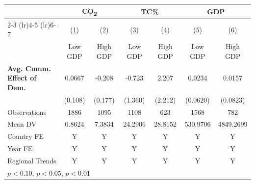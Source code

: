 \begin{tabular}{l*{6}{c}}
\hline
& \multicolumn{2}{c}{CO\textsubscript{2}} & \multicolumn{2}{c}{TC\%} & \multicolumn{2}{c}{GDP} \\
\cmidrule(lr){2-3} \cmidrule(lr){4-5} \cmidrule(lr){6-7}
            &\multicolumn{1}{c}{(1)}&\multicolumn{1}{c}{(2)}&\multicolumn{1}{c}{(3)}&\multicolumn{1}{c}{(4)}&\multicolumn{1}{c}{(5)}&\multicolumn{1}{c}{(6)}\\
            &\multicolumn{1}{c}{Low GDP}&\multicolumn{1}{c}{High GDP}&\multicolumn{1}{c}{Low GDP}&\multicolumn{1}{c}{High GDP}&\multicolumn{1}{c}{Low GDP}&\multicolumn{1}{c}{High GDP}\\
\hline
\textbf{Avg. Cumm. Effect of Dem.}&      0.0667         &      -0.208         &      -0.723         &       2.207         &      0.0234         &      0.0157         \\
            &     (0.108)         &     (0.177)         &     (1.360)         &     (2.212)         &    (0.0620)         &    (0.0823)         \\
\midrule
Observations&        1886         &        1095         &        1108         &         623         &        1568         &         782         \\
Mean DV     &      0.8624         &      7.3834         &     24.2906         &     28.8152         &    530.9706         &   4849.2699         \\
Country FE  &           Y         &           Y         &           Y         &           Y         &           Y         &           Y         \\
Year FE     &           Y         &           Y         &           Y         &           Y         &           Y         &           Y         \\
Regional Trends&           Y         &           Y         &           Y         &           Y         &           Y         &           Y         \\
\hline
\multicolumn{7}{l}{\footnotesize \sym{*} \(p<0.10\), \sym{**} \(p<0.05\), \sym{***} \(p<0.01\)}\\
\end{tabular}
